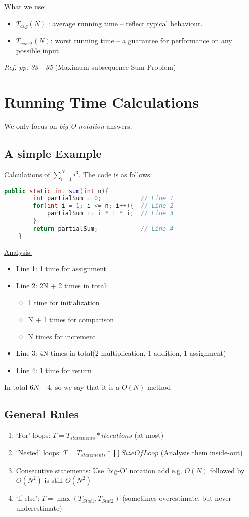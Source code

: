 \documentclass[12pt]{article}
\theoremstyle{definition}
\begin{document}
What we use:
\begin{itemize}
    \item $T_{avg}(N)$ : average running time -- reflect typical behaviour.
    \item $T_{worst}(N)$: worst running time -- a guarantee for performance on any possible input
\end{itemize}
\emph{Ref: pp. 33 - 35} (Maximum subsequence Sum Problem)

\section{Running Time Calculations}
We only focus on \emph{big-O notation} answers.

\subsection{A simple Example}
Calculations of $\sum_{i=1}^N i^3$. The code is as follows:
\begin{lstlisting}[language=Java]
    public static int sum(int n){
        int partialSum = 0;           // Line 1
        for(int i = 1; i <= n; i++){  // Line 2
            partialSum += i * i * i;  // Line 3
        }
        return partialSum;            // Line 4
    }
\end{lstlisting}

\underline{Analysis:}
\begin{itemize}
    \item Line 1: 1 time for assignment
    \item Line 2: 2N + 2 times in total:
    \begin{itemize}
        \item 1 time for initialization
        \item N + 1 times for comparison
        \item N times for increment
    \end{itemize}
    \item Line 3: 4N times in total(2 multiplication, 1 addition, 1 assignment)
    \item Line 4: 1 time for return
\end{itemize}
In total $6N + 4$, so we say that it is a $O(N)$ method 

\subsection{General Rules}
\begin{enumerate}
    \item `For' loops: $T = T_{statements} * iterations$ (at most)
    \item `Nested' loops: $T = T_{statements} * \prod_{}SizeOfLoop$ (Analysis them inside-out)
    \item Consecutive statements: Use `big-O' notation add \newline 
    e.g. $O(N)$ followed by $O(N^2)$ is still $O(N^2)$
    \item `if-else': $T = \max(T_{Stat1}, T_{Stat2})$ (sometimes overestimate, but never underestimate)
\end{enumerate}
\end{document}
